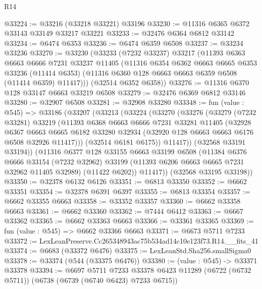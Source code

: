 \begin{lexlean}{R14}
\begin{coremodule}
@33224 := @33216 (@33218 @33221) @33196
@33230 := @11316 @6365 @6372 @33143 @33149 @33217 @33221
@33233 := @32476 @6364 @6812 @33142
@33234 := @6474 @6353
@33236 := @6474 @6359 @6508
@33237 := @33234 @33236
@33270 := @33230
    (@33233
      (@7232 @33237)
      @33217
      (@11393
        @6363
        @6663
        @6666
        @7231
        @33237
        @11405
        (@11316
          @6354
          @6362
          @6663
          @6665
          @6353
          @33236
          (@11414 @6353)
          (@11316 @6360 @128 @6663 @6663 @6359 @6508 (@11414 @6359) @11417)))
      (@32514 @6352 @6358))
@33276 := @11316 @6370 @128 @33147 @6663 @33219 @6508
@33279 := @32476 @6369 @6812 @33146
@33280 := @32907 @6508
@33281 := @32908 @33280
@33348 := fun (value : @545) =>
  @33186
    (@33207
      (@33213
        (@33224
          (@33270
            (@33276
              (@33279
                (@7232 @33281)
                @33219
                (@11393
                  @6368
                  @6663
                  @6666
                  @7231
                  @33281
                  @11405
                  (@32928
                    @6367
                    @6663
                    @6665
                    @6182
                    @33280
                    @32934
                    (@32920 @128 @6663 @6663 @6176 @6508 @32926 @11417)))
                (@32514 @6181 @6175))
              @11417))
          (@32568 @33191 @33194))
        (@11316
          @6377
          @128
          @33155
          @6663
          @33199
          @6508
          (@11384
            @6376
            @6666
            @33154
            (@7232 @32962)
            @33199
            (@11393 @6206 @6663 @6665 @7231 @32962 @11405 @32989)
            (@11422 @6202))
          @11417))
      (@32568 @33195 @33198))
@33350 := @32378 @6132 @6126
@33351 := @6813 @33350
@33352 := @6662 @33351
@33354 := @32378 @6391 @6397
@33355 := @6813 @33354
@33357 := @6662 @33355 @6663
@33358 := @33352 @33357
@33360 := @6662 @33358 @6663
@33361 := @6662 @33360
@33362 := @7444 @6412
@33363 := @6667 @33362
@33365 := @6662 @33363 @6663
@33366 := @33361 @33365
@33369 := fun (value : @545) => @6662 @33366 @6663
@33371 := @6673 @5711 @7233
@33372 := LexLeanPreserve.Cc265348943ac75b534ad14c10e123f73.R14.__fits_41
@33374 := @6683 (@33372 @6476)
@33375 := LexLeanStd.Sha256.smallSigma0
@33378 := @33374 (@544 (@33375 @6476))
@33380 := (value : @545) -> @33371 @33378
@33394 := @6697
    @5711
    @7233
    @33378
    @6423
    @11289
    (@6722 (@6732 @5711))
    (@6738 (@6739 (@6740 @6423) @7233 @6715))

\end{coremodule}
\end{lexlean}
